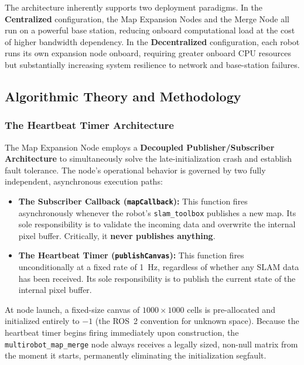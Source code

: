 The architecture inherently supports two deployment paradigms. In the \textbf{Centralized} configuration, the Map Expansion Nodes and the Merge Node all run on a powerful base station, reducing onboard computational load at the cost of higher bandwidth dependency. In the \textbf{Decentralized} configuration, each robot runs its own expansion node onboard, requiring greater onboard CPU resources but substantially increasing system resilience to network and base-station failures.

\subsection{Algorithmic Theory and Methodology}
\label{subsec:map_merge_algorithm}

\subsubsection{The Heartbeat Timer Architecture}
\label{subsubsec:heartbeat}

The Map Expansion Node employs a \textbf{Decoupled Publisher/Subscriber Architecture} to simultaneously solve the late-initialization crash and establish fault tolerance. The node's operational behavior is governed by two fully independent, asynchronous execution paths:

\begin{itemize}
    \item \textbf{The Subscriber Callback (\texttt{mapCallback}):} This function fires asynchronously whenever the robot's \texttt{slam\_toolbox} publishes a new map. Its sole responsibility is to validate the incoming data and overwrite the internal pixel buffer. Critically, it \textbf{never publishes anything}.

    \item \textbf{The Heartbeat Timer (\texttt{publishCanvas}):} This function fires unconditionally at a fixed rate of 1~Hz, regardless of whether any SLAM data has been received. Its sole responsibility is to publish the current state of the internal pixel buffer.
\end{itemize}

At node launch, a fixed-size canvas of $1000 \times 1000$ cells is pre-allocated and initialized entirely to $-1$ (the ROS~2 convention for unknown space). Because the heartbeat timer begins firing immediately upon construction, the \texttt{multirobot\_map\_merge} node always receives a legally sized, non-null matrix from the moment it starts, permanently eliminating the initialization segfault.

